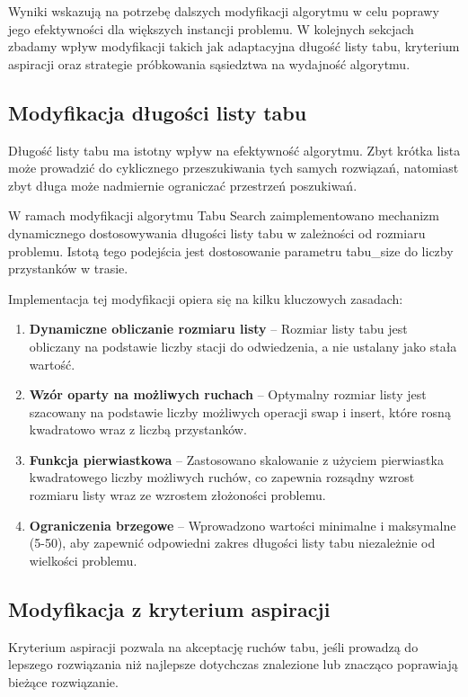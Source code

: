 \documentclass[12pt,a4paper]{article}
\begin{document}
Wyniki wskazują na potrzebę dalszych modyfikacji algorytmu w celu poprawy jego efektywności dla większych instancji problemu. W kolejnych sekcjach zbadamy wpływ modyfikacji takich jak adaptacyjna długość listy tabu, kryterium aspiracji oraz strategie próbkowania sąsiedztwa na wydajność algorytmu.

\subsection{Modyfikacja długości listy tabu}
Długość listy tabu ma istotny wpływ na efektywność algorytmu. Zbyt krótka lista może prowadzić do cyklicznego przeszukiwania tych samych rozwiązań, natomiast zbyt długa może nadmiernie ograniczać przestrzeń poszukiwań.

W ramach modyfikacji algorytmu Tabu Search zaimplementowano mechanizm dynamicznego dostosowywania długości listy tabu w zależności od rozmiaru problemu. Istotą tego podejścia jest dostosowanie parametru tabu_size do liczby przystanków w trasie.

Implementacja tej modyfikacji opiera się na kilku kluczowych zasadach:

\begin{enumerate}
    \item \textbf{Dynamiczne obliczanie rozmiaru listy} -- Rozmiar listy tabu jest obliczany na podstawie liczby stacji do odwiedzenia, a nie ustalany jako stała wartość.
    
    \item \textbf{Wzór oparty na możliwych ruchach} -- Optymalny rozmiar listy jest szacowany na podstawie liczby możliwych operacji swap i insert, które rosną kwadratowo wraz z liczbą przystanków.
    
    \item \textbf{Funkcja pierwiastkowa} -- Zastosowano skalowanie z użyciem pierwiastka kwadratowego liczby możliwych ruchów, co zapewnia rozsądny wzrost rozmiaru listy wraz ze wzrostem złożoności problemu.
    
    \item \textbf{Ograniczenia brzegowe} -- Wprowadzono wartości minimalne i maksymalne (5-50), aby zapewnić odpowiedni zakres długości listy tabu niezależnie od wielkości problemu.
\end{enumerate}

\subsection{Modyfikacja z kryterium aspiracji}
Kryterium aspiracji pozwala na akceptację ruchów tabu, jeśli prowadzą do lepszego rozwiązania niż najlepsze dotychczas znalezione lub znacząco poprawiają bieżące rozwiązanie.
\end{document}
